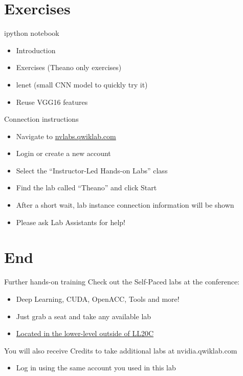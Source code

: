 \documentclass[utf8x,xcolor=pdftex,dvipsnames,table]{beamer}
\begin{document}
\section{Exercises}
\begin{frame}
  \tableofcontents[currentsection]
\end{frame}

\begin{frame}{ipython notebook}
\begin{itemize}
\item Introduction
\item Exercises (Theano only exercises)
\item lenet (small CNN model to quickly try it)
\item Reuse VGG16 features
\end{itemize}
\end{frame}


\begin{frame}{Connection instructions}
\begin{itemize}
\item Navigate to \url{nvlabs.qwiklab.com}
\item Login or create a new account
\item Select the ``Instructor-Led Hands-on Labs'' class
\item Find the lab called ``Theano'' and click Start
\item After a short wait, lab instance connection information will be shown
\item Please ask Lab Assistants for help!
\end{itemize}
\end{frame}


\section{End}
\begin{frame}{Further hands-on training}
Check out the Self-Paced labs at the conference:
\begin{itemize}
  \item Deep Learning, CUDA, OpenACC, Tools and more!
  \item Just grab a seat and take any available lab
  \item \underline{Located in the lower-level outside of LL20C}\newline
\end{itemize}

You will also receive Credits to take additional labs at nvidia.qwiklab.com
\begin{itemize}
\item Log in using the same account you used in this lab
\end{itemize}
\end{frame}
\end{document}
